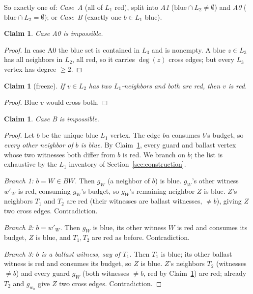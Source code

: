 \documentclass[11pt]{article}
\newtheorem{claim}[theorem]{Claim}
\newcommand{\BW}{\mathit{BW}}
\begin{document}
So exactly one of: \emph{Case~A} (all of $L_1$ red), split into
\emph{A1} ($\mathrm{blue} \cap L_2 \ne \emptyset$) and \emph{A0}
($\mathrm{blue} \cap L_2 = \emptyset$); or \emph{Case~B} (exactly one
$b \in L_1$ blue).

\begin{claim}\label{cl:a0}
Case A0 is impossible.
\end{claim}
\begin{proof}
In case A0 the blue set is contained in $L_3$ and is nonempty. A blue
$z \in L_3$ has all neighbors in $L_2$, all red, so it carries
$\deg(z)$ cross edges; but every $L_3$ vertex has degree $\ge 2$.
\end{proof}

\begin{claim}[freeze]\label{cl:freeze}
If $v \in L_2$ has two $L_1$-neighbors and both are red, then $v$ is
red.
\end{claim}
\begin{proof}
Blue $v$ would cross both.
\end{proof}

\begin{claim}\label{cl:caseB}
Case B is impossible.
\end{claim}
\begin{proof}
Let $b$ be the unique blue $L_1$ vertex. The edge $bu$ consumes $b$'s
budget, so \emph{every other neighbor of $b$ is blue}. By
Claim~\ref{cl:freeze}, every guard and ballast vertex whose two
witnesses both differ from $b$ is red. We branch on $b$; the list is
exhaustive by the $L_1$ inventory of Section~\ref{sec:construction}.

\emph{Branch 1: $b = W \in \BW$.} Then $g_W$ (a neighbor of $b$) is
blue. $g_W$'s other witness $w'_W$ is red, consuming $g_W$'s budget,
so $g_W$'s remaining neighbor $Z$ is blue. $Z$'s neighbors $T_1$
and $T_2$ are red (their witnesses are ballast witnesses, $\ne b$),
giving $Z$ two cross edges. Contradiction.

\emph{Branch 2: $b = w'_W$.} Then $g_W$ is blue, its other witness
$W$ is red and consumes its budget, $Z$ is blue, and $T_1, T_2$ are
red as before. Contradiction.

\emph{Branch 3: $b$ is a ballast witness, say of $T_1$.} Then $T_1$
is blue; its other ballast witness is red and consumes its budget, so
$Z$ is blue. $Z$'s neighbors $T_2$ (witnesses $\ne b$) and every
guard $g_W$ (both witnesses $\ne b$, red by Claim~\ref{cl:freeze})
are red; already $T_2$ and $g_{w_a}$ give $Z$ two cross edges.
Contradiction.
\end{proof}
\end{document}
